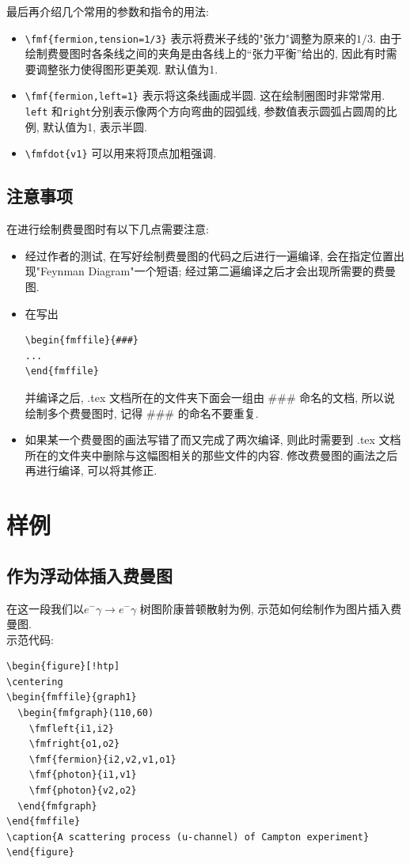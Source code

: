 \documentclass{article}
\begin{document}
最后再介绍几个常用的参数和指令的用法:
\begin{itemize}
\item \verb+\fmf{fermion,tension=1/3}+ 表示将费米子线的"张力"调整为原来的$1/3$. 由于绘制费曼图时各条线之间的夹角是由各线上的``张力平衡''给出的, 因此有时需要调整张力使得图形更美观. 默认值为1.
\item \verb+\fmf{fermion,left=1}+ 表示将这条线画成半圆. 这在绘制圈图时非常常用. \verb+left+ 和\verb+right+分别表示像两个方向弯曲的园弧线, 参数值表示圆弧占圆周的比例, 默认值为1, 表示半圆.
\item \verb+\fmfdot{v1}+ 可以用来将顶点加粗强调.
\end{itemize}

\subsection{注意事项}
在进行绘制费曼图时有以下几点需要注意:
\begin{itemize}
\item
经过作者的测试, 在写好绘制费曼图的代码之后进行一遍编译, 会在指定位置出现"Feynman Diagram"一个短语; 经过第二遍编译之后才会出现所需要的费曼图.
\item
在写出
\begin{verbatim}
\begin{fmffile}{###}
...
\end{fmffile}
\end{verbatim}
并编译之后, .tex 文档所在的文件夹下面会一组由 \#\#\# 命名的文档, 所以说绘制多个费曼图时, 记得 \#\#\# 的命名不要重复.
\item 如果某一个费曼图的画法写错了而又完成了两次编译, 则此时需要到 .tex 文档所在的文件夹中删除与这幅图相关的那些文件的内容. 修改费曼图的画法之后再进行编译, 可以将其修正.
\end{itemize}

\section{样例}
\subsection{作为浮动体插入费曼图}
在这一段我们以$e^{-}\gamma\rightarrow e^{-}\gamma$ 树图阶康普顿散射为例, 示范如何绘制作为图片插入费曼图.\\
示范代码:
\begin{verbatim}
\begin{figure}[!htp]
\centering
\begin{fmffile}{graph1}
  \begin{fmfgraph}(110,60)
    \fmfleft{i1,i2}
    \fmfright{o1,o2}
    \fmf{fermion}{i2,v2,v1,o1}
    \fmf{photon}{i1,v1}
    \fmf{photon}{v2,o2}
  \end{fmfgraph}
\end{fmffile}
\caption{A scattering process (u-channel) of Campton experiment}
\end{figure}
\end{verbatim}
\end{document}
